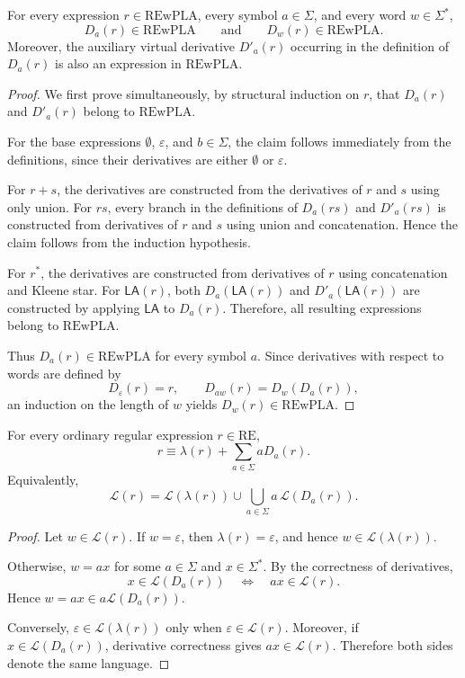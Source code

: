 \begin{theorem}
For every expression $r\in\mathrm{REwPLA}$, every symbol
$a\in\Sigma$, and every word $w\in\Sigma^*$,
\[
D_a(r)\in\mathrm{REwPLA}
\qquad\text{and}\qquad
D_w(r)\in\mathrm{REwPLA}.
\]
Moreover, the auxiliary virtual derivative $D'_a(r)$ occurring in the
definition of $D_a(r)$ is also an expression in $\mathrm{REwPLA}$.
\end{theorem}

\begin{proof}
We first prove simultaneously, by structural induction on $r$, that
$D_a(r)$ and $D'_a(r)$ belong to $\mathrm{REwPLA}$.

For the base expressions $\emptyset$, $\varepsilon$, and $b\in\Sigma$,
the claim follows immediately from the definitions, since their
derivatives are either $\emptyset$ or $\varepsilon$.

For $r+s$, the derivatives are constructed from the derivatives of
$r$ and $s$ using only union. For $rs$, every branch in the definitions
of $D_a(rs)$ and $D'_a(rs)$ is constructed from derivatives of $r$ and
$s$ using union and concatenation. Hence the claim follows from the
induction hypothesis.

For $r^*$, the derivatives are constructed from derivatives of $r$
using concatenation and Kleene star. For $\mathsf{LA}(r)$, both
$D_a(\mathsf{LA}(r))$ and $D'_a(\mathsf{LA}(r))$ are constructed by
applying $\mathsf{LA}$ to $D_a(r)$. Therefore, all resulting expressions
belong to $\mathrm{REwPLA}$.

Thus $D_a(r)\in\mathrm{REwPLA}$ for every symbol $a$. Since derivatives
with respect to words are defined by
\[
D_\varepsilon(r)=r,
\qquad
D_{aw}(r)=D_w(D_a(r)),
\]
an induction on the length of $w$ yields
$D_w(r)\in\mathrm{REwPLA}$.
\end{proof}

\begin{theorem}
For every ordinary regular expression $r\in\mathrm{RE}$,
\[
r
\equiv
\lambda(r)
+
\sum_{a\in\Sigma} aD_a(r).
\]
Equivalently,
\[
\mathcal{L}(r)
=
\mathcal{L}(\lambda(r))
\cup
\bigcup_{a\in\Sigma}
a\,\mathcal{L}(D_a(r)).
\]
\end{theorem}

\begin{proof}
Let $w\in\mathcal{L}(r)$. If $w=\varepsilon$, then
$\lambda(r)=\varepsilon$, and hence
$w\in\mathcal{L}(\lambda(r))$.

Otherwise, $w=ax$ for some $a\in\Sigma$ and $x\in\Sigma^*$. By the
correctness of derivatives,
\[
x\in\mathcal{L}(D_a(r))
\quad\Longleftrightarrow\quad
ax\in\mathcal{L}(r).
\]
Hence $w=ax\in a\mathcal{L}(D_a(r))$.

Conversely, $\varepsilon\in\mathcal{L}(\lambda(r))$ only when
$\varepsilon\in\mathcal{L}(r)$. Moreover, if
$x\in\mathcal{L}(D_a(r))$, derivative correctness gives
$ax\in\mathcal{L}(r)$. Therefore both sides denote the same language.
\end{proof}